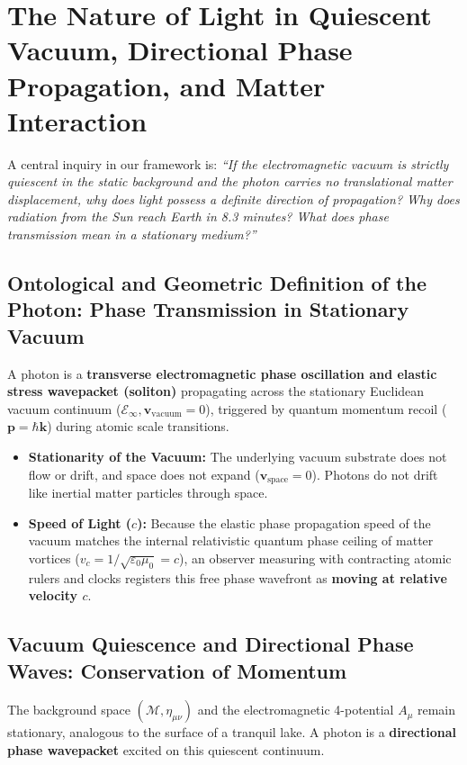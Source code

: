 \section{The Nature of Light in Quiescent Vacuum, Directional Phase Propagation, and Matter Interaction}
\label{sec:isik_yonlu_yayilim}

A central inquiry in our framework is: \textit{``If the electromagnetic vacuum is strictly quiescent in the static background and the photon carries no translational matter displacement, why does light possess a definite direction of propagation? Why does radiation from the Sun reach Earth in 8.3 minutes? What does phase transmission mean in a stationary medium?''}

\subsection{Ontological and Geometric Definition of the Photon: Phase Transmission in Stationary Vacuum}
\label{sec:foton_tanim}

\begin{definition}
    \label{def:foton_tanimi_main}
    A photon is a \textbf{transverse electromagnetic phase oscillation and elastic stress wavepacket (soliton)} propagating across the stationary Euclidean vacuum continuum ($\mathcal{E}_\infty, \mathbf{v}_{\mathrm{vacuum}}=0$), triggered by quantum momentum recoil ($\mathbf{p} = \hbar \mathbf{k}$) during atomic scale transitions.
    \begin{itemize}
        \item \textbf{Stationarity of the Vacuum:} The underlying vacuum substrate does not flow or drift, and space does not expand ($\mathbf{v}_{\mathrm{space}} = 0$). Photons do not drift like inertial matter particles through space.
        \item \textbf{Speed of Light ($c$):} Because the elastic phase propagation speed of the vacuum matches the internal relativistic quantum phase ceiling of matter vortices ($v_c = 1/\sqrt{\varepsilon_0\mu_0} = c$), an observer measuring with contracting atomic rulers and clocks registers this free phase wavefront as \textbf{moving at relative velocity $c$}.
    \end{itemize}
\end{definition}

\subsection{Vacuum Quiescence and Directional Phase Waves: Conservation of Momentum}
The background space $(\mathcal{M}, \eta_{\mu\nu})$ and the electromagnetic 4-potential $A_\mu$ remain stationary, analogous to the surface of a tranquil lake. A photon is a \textbf{directional phase wavepacket} excited on this quiescent continuum.

